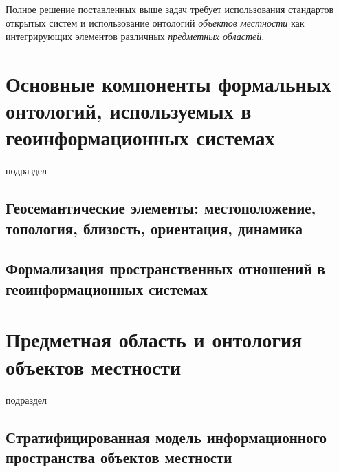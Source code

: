 Полное решение поставленных выше задач требует использования стандартов открытых систем и использование онтологий \textit{объектов местности} как интегрирующих элементов различных \textit{предметных областей}.

\section{Основные компоненты формальных онтологий, используемых в геоинформационных системах}
\label{chapter_gis_sec_components}

\begin{SCn}
\bigskip

\begin{scnrelfromlist}{подраздел}
\end{scnrelfromlist}

\bigskip
\end{SCn}

\subsection{Геосемантические элементы: местоположение, топология, близость, ориентация, динамика}
\label{chapter_gis_sec_geo_elements}

\subsection{Формализация пространственных отношений в геоинформационных системах}
\label{chapter_gis_sec_relations}


\section{Предметная область и онтология объектов местности}
\label{chapter_gis_sec_objects_model}

\begin{SCn}
\begin{scnrelfromlist}{подраздел}
\end{scnrelfromlist}
\end{SCn}

\subsection{Стратифицированная модель информационного пространства объектов местности}
\label{chapter_gis_sec_strat_model}

